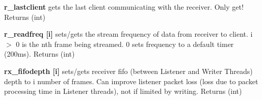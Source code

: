 \begin{DoxyItemize}
\item {\bfseries r\_\-lastclient} gets the last client communicating with the receiver. Only get! {\ttfamily Returns} {\ttfamily }(int)
\end{DoxyItemize}


\begin{DoxyItemize}
\item {\bfseries r\_\-readfreq \mbox{[}i\mbox{]}} sets/gets the stream frequency of data from receiver to client. i $>$ 0 is the nth frame being streamed. 0 sets frequency to a default timer (200ms). {\ttfamily Returns} {\ttfamily }(int)
\end{DoxyItemize}


\begin{DoxyItemize}
\item {\bfseries rx\_\-fifodepth \mbox{[}i\mbox{]}} sets/gets receiver fifo (between Listener and Writer Threads) depth to i number of frames. Can improve listener packet loss (loss due to packet processing time in Listener threads), not if limited by writing. {\ttfamily Returns} {\ttfamily }(int) 
\end{DoxyItemize}